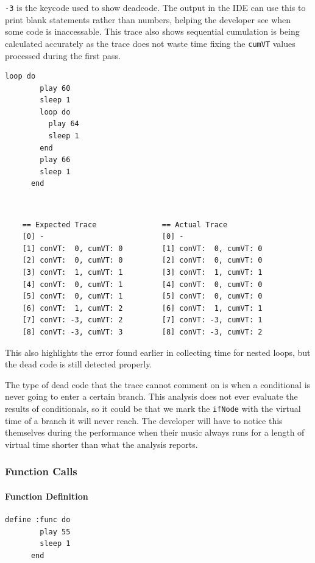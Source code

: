 \documentclass[11pt, abstracton, twoside, titlepage=true]{scrartcl}
\begin{document}
\texttt{-3} is the keycode used to show deadcode. The output in the IDE can use 
this to print blank statements rather than numbers, helping the developer see
when some code is inaccessable. This trace also shows sequential cumulation is 
being calculated accurately as the trace does not waste time fixing the 
\texttt{cumVT} values processed during the first pass.

\begin{minipage}{\textwidth}
	\begin{lstlisting}[style = sonicpi]
      loop do
        play 60
        sleep 1
        loop do
          play 64
          sleep 1
        end
        play 66
        sleep 1
      end
	\end{lstlisting}
\end{minipage}
\\
\begin{lstlisting}
    == Expected Trace               == Actual Trace
    [0] -                           [0] -
    [1] conVT:  0, cumVT: 0         [1] conVT:  0, cumVT: 0
    [2] conVT:  0, cumVT: 0         [2] conVT:  0, cumVT: 0
    [3] conVT:  1, cumVT: 1         [3] conVT:  1, cumVT: 1
    [4] conVT:  0, cumVT: 1         [4] conVT:  0, cumVT: 0
    [5] conVT:  0, cumVT: 1         [5] conVT:  0, cumVT: 0
    [6] conVT:  1, cumVT: 2         [6] conVT:  1, cumVT: 1
    [7] conVT: -3, cumVT: 2         [7] conVT: -3, cumVT: 1
    [8] conVT: -3, cumVT: 3         [8] conVT: -3, cumVT: 2
\end{lstlisting}

This also highlights the error found earlier in collecting time for nested loops, 
but the dead code is still detected properly.

The type of dead code that the trace cannot comment on is when a conditional is 
never going to enter a certain branch. This analysis does not ever evaluate the 
results of conditionals, so it could be that we mark the \texttt{ifNode} with the 
virtual time of a branch it will never reach. The developer will have to notice this 
themselves during the performance when their music always runs for a length of 
virtual time shorter than what the analysis reports.

\subsubsection{Function Calls}
\paragraph{Function Definition}
\begin{minipage}{\textwidth}
	\begin{lstlisting}[style = sonicpi]
      define :func do
        play 55
        sleep 1
      end
	\end{lstlisting}
\end{minipage}
\end{document}

